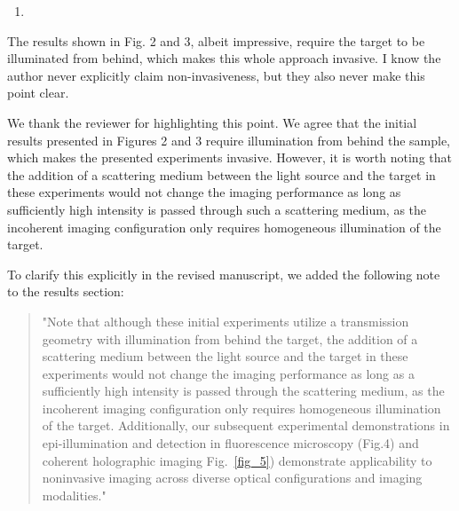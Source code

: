 \documentclass[12pt]{article}
\newenvironment{solved_reviewercomment}
    {\begin{tcolorbox}[width=\linewidth,colback=gray!5,colframe=solved_commentcolor!50,title=Reviewer Comment,left=5pt,right=5pt]}
    {\end{tcolorbox}}
\newenvironment{finished_ourresponse}
    {\begin{tcolorbox}[width=\linewidth,breakable,enhanced,colback=gray!5,colframe=finished_responsecolor!50,title=Response,left=5pt,right=5pt]}
    {\end{tcolorbox}}
\begin{document}
        
\begin{enumerate}[label=\arabic*., resume]
\item \leavevmode
\end{enumerate}
\vspace{-1em}
\begin{solved_reviewercomment}
    The results shown in Fig. 2 and 3, albeit impressive, require the target to be illuminated from behind, which makes this whole approach invasive. I know the author never explicitly claim non-invasiveness, but they also never make this point clear.
\end{solved_reviewercomment}

\begin{finished_ourresponse}
    We thank the reviewer for highlighting this point.
    We agree that the initial results presented in Figures 2 and 3 require illumination from behind the sample, which makes the presented experiments invasive. However, it is worth noting that the addition of a scattering medium between the light source and the target in these experiments would not change the imaging performance as long as sufficiently high intensity is passed through such a scattering medium, as the incoherent imaging configuration only requires homogeneous illumination of the target.
    
    To clarify this explicitly in the revised manuscript, we added the following note to the results section:
    \begin{quote}
        "Note that although these initial experiments utilize a transmission geometry with illumination from behind the target, the addition of a scattering medium between the light source and the target in these experiments would not change the imaging performance as long as a sufficiently high intensity is passed through the scattering medium, as the incoherent imaging configuration only requires homogeneous illumination of the target. Additionally, our subsequent experimental demonstrations in epi-illumination and detection in fluorescence microscopy (Fig.4) and coherent holographic imaging Fig.~\ref{fig_5}) demonstrate applicability to noninvasive imaging across diverse optical configurations and imaging modalities."
    \end{quote}

\end{finished_ourresponse}
\end{document}
